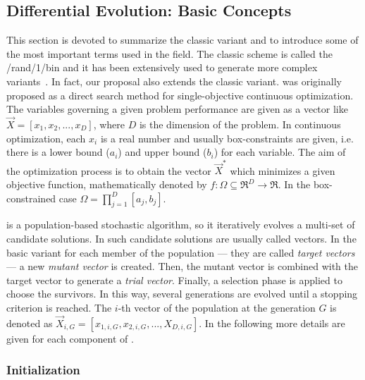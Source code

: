 \subsection{Differential Evolution: Basic Concepts}

This section is devoted to summarize the classic \DE{} variant and to introduce some of the most important terms used in the \DE{} field.
%
The classic \DE{} scheme is called the \DE{}/rand/1/bin and it has been extensively used to generate more complex \DE{} variants~\cite{das2011differential}.
%
In fact, our proposal also extends the classic variant.
%
%
\DE{} was originally proposed as a direct search method for single-objective continuous optimization.
%
The variables governing a given problem performance are given as a vector like $\vec{X} = [x_1, x_2, ..., x_D]$, where $D$ is the
dimension of the problem.
%
In continuous optimization, each $x_i$ is a real number and usually box-constraints are given, i.e. there is a lower bound ($a_{i}$) and
upper bound ($b_{i}$) for each variable.
%
The aim of the optimization process is to obtain the vector $\vec{X}^*$ which minimizes a given objective function, mathematically 
denoted by $f : \Omega \subseteq \Re^D \rightarrow \Re$.
%
In the box-constrained case $\Omega = {\prod}_{j=1}^{D} [a_{j}, b_{j}]$.

\DE{} is a population-based stochastic algorithm, so it iteratively evolves a multi-set of candidate solutions.
%
In \DE{} such candidate solutions are usually called vectors.
%
In the basic \DE{} variant for each member of the population --- they are called \textit{target vectors} --- a new \textit{mutant vector}
is created.
%
Then, the mutant vector is combined with the target vector to generate a \textit{trial vector}.
%
Finally, a selection phase is applied to choose the survivors.
%
In this way, several generations are evolved until a stopping criterion is reached.
%
The $i$-th vector of the population at the generation $G$ is denoted as $\vec{X}_{i,G} = [x_{1,i,G}, x_{2,i,G},..., X_{D,i, G}]$.
%
In the following more details are given for each component of \DE{}.


\subsubsection{Initialization}

